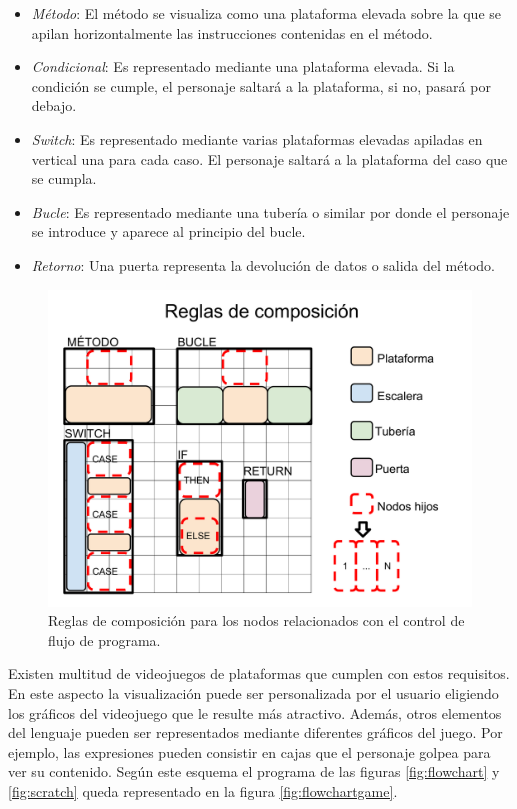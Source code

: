 \documentclass{llncs}
\begin{document}
\begin{itemize}
\item {\em Método}: El método se visualiza como una plataforma elevada sobre la que se apilan horizontalmente las instrucciones contenidas en el método.
\item {\em Condicional}: Es representado mediante una plataforma elevada. Si la condición se cumple, el personaje saltará a la plataforma, si no, pasará por debajo.
\item {\em Switch}: Es representado mediante varias plataformas elevadas apiladas en vertical una para cada caso. El personaje saltará a la plataforma del caso que se cumpla.
\item {\em Bucle}: Es representado mediante una tubería o similar por donde el personaje se introduce y aparece al principio del bucle.
\item {\em Retorno}: Una puerta representa la devolución de datos o salida del método.
\end{itemize}

\begin{figure}[ht]
\begin{center}
\includegraphics[scale=0.2]{images/nodos2.pdf}
\caption{Reglas de composición para los nodos relacionados con el control de flujo de programa.
\label{fig:rules}}
\end{center}
\end{figure}

Existen multitud de videojuegos de plataformas que cumplen con estos requisitos. En este aspecto la visualización puede ser personalizada por el usuario eligiendo los gráficos del videojuego que le resulte más atractivo. Además, otros elementos del lenguaje pueden ser representados mediante diferentes gráficos del juego. Por ejemplo, las expresiones pueden consistir en cajas que el personaje golpea para ver su contenido. Según este esquema el programa de las figuras \ref{fig:flowchart} y \ref{fig:scratch} queda representado en la figura \ref{fig:flowchartgame}.
\end{document}
